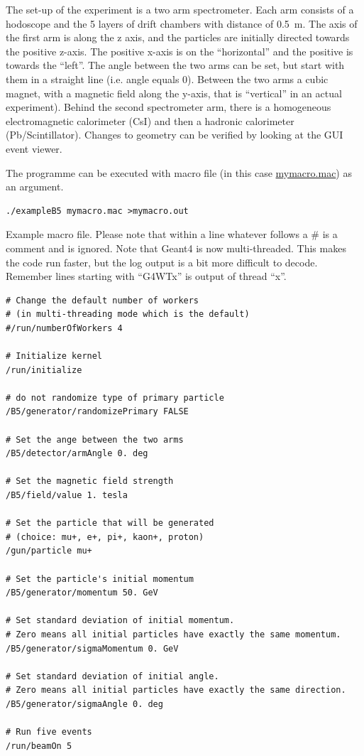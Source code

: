 \documentclass[a4paper,11pt,twoside]{article}
\begin{document}
The set-up of the experiment is a two arm spectrometer. Each arm consists of a hodoscope and the 5 layers of drift chambers with distance of 0.5~m. 
The axis of the first arm is along the z axis, and the particles are initially directed towards the positive z-axis. The positive x-axis is on the ``horizontal'' and the positive is towards the ``left''. The angle between the two arms can be set, but start with them in a straight line (i.e. angle equals 0).
Between the two arms a cubic magnet, with a magnetic field along the y-axis, that is ``vertical''  in an actual experiment). Behind the second spectrometer arm, there is a homogeneous electromagnetic calorimeter (CsI) and then a hadronic calorimeter (Pb/Scintillator). Changes to geometry can be verified by looking at the GUI event viewer.

The programme can be executed with macro file (in this case \href{https://github.com/knikolop-bham/MPAGS-EPPT-B5/blob/master/mymacro.mac}{mymacro.mac}) as an argument.
\begin{lstlisting}
./exampleB5 mymacro.mac >mymacro.out
\end{lstlisting}

Example macro file. Please note that within a line whatever follows a \# is a comment and is ignored. 
Note that Geant4 is now multi-threaded. This makes the code run faster, but the log output is a bit more difficult to decode. Remember lines starting with ``G4WTx'' is output of thread ``x''. 
\begin{lstlisting}
# Change the default number of workers 
# (in multi-threading mode which is the default)
#/run/numberOfWorkers 4

# Initialize kernel
/run/initialize 

# do not randomize type of primary particle
/B5/generator/randomizePrimary FALSE

# Set the ange between the two arms
/B5/detector/armAngle 0. deg

# Set the magnetic field strength
/B5/field/value 1. tesla

# Set the particle that will be generated 
# (choice: mu+, e+, pi+, kaon+, proton)
/gun/particle mu+

# Set the particle's initial momentum
/B5/generator/momentum 50. GeV

# Set standard deviation of initial momentum. 
# Zero means all initial particles have exactly the same momentum.
/B5/generator/sigmaMomentum 0. GeV

# Set standard deviation of initial angle. 
# Zero means all initial particles have exactly the same direction.
/B5/generator/sigmaAngle 0. deg

# Run five events
/run/beamOn 5
\end{lstlisting}
\end{document}
